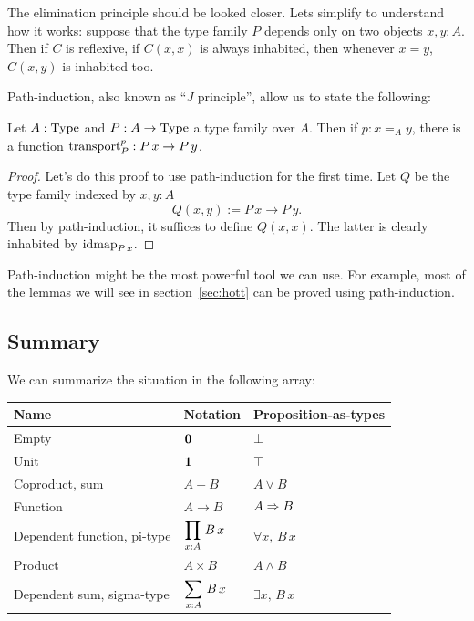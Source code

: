 The elimination principle should be looked closer. Lets simplify to
understand how it works: suppose that the type family $P$ depends only
on two objects $x,y:A$. Then if $C$ is reflexive, \ie{} if $C(x,x)$ is
always inhabited, then whenever $x=y$, $C(x,y)$ is inhabited too.

Path-induction, also known as ``$J$ principle'', allow us to state
the following:
\begin{lem}
  Let $A:\operatorname{Type}$ and $P:A\to\operatorname{Type}$ a type family over $A$. Then if
  $p:x=_A y$, there is a function $\operatorname{transport}_P^p :P\, x\to P\, y$.
\end{lem}
\begin{proof}
  Let's do this proof to use path-induction for the first time. Let
  $Q$ be the type family indexed by $x,y:A$ 
  \[ Q(x,y) := P\, x \to P\, y. \]
  Then by path-induction, it suffices to define $Q(x,x)$. The latter
  is clearly inhabited by $\operatorname{\mathrm{idmap}}_{P\, x}$.
\end{proof}

Path-induction might be the most powerful tool we can use. For
example, most of the lemmas we will see in section~\ref{sec:hott} can
be proved using path-induction.

\subsection{Summary}
\label{ssec:mltt_summary}

We can summarize the situation in the following array:

\renewcommand{\arraystretch}{2}
\begin{tabular}{|l|l|l|}
  \hline
  Name & Notation & Proposition-as-types \\
  \hline\hline
  Empty & $\displaystyle{\mathbf{0}}$ & $\displaystyle{\bot}$ \\
  \hline
  Unit & $\displaystyle{\mathbf{1}}$ & $\displaystyle{\top}$ \\
  \hline
  Coproduct, sum & $\displaystyle{A+B}$ & $\displaystyle{A\lor B}$ \\
  \hline
  Function & $\displaystyle{A\to B}$ & $\displaystyle{A\Rightarrow B}$ \\
  \hline
  Dependent function, pi-type & $\displaystyle{\prod_{x:A}\, B\, x}$ & $\displaystyle{\forall x,\,
                                                       B\, x}$ \\
  \hline
  Product & $\displaystyle{A\times B}$ & $\displaystyle{A\land B}$ \\
  \hline
  Dependent sum, sigma-type & $\displaystyle{\sum_{x:A}\, B\, x}$ & $\displaystyle{\exists x,\, B\,
                                                    x}$ \\
  \hline
\end{tabular}
\renewcommand{\arraystretch}{1}

